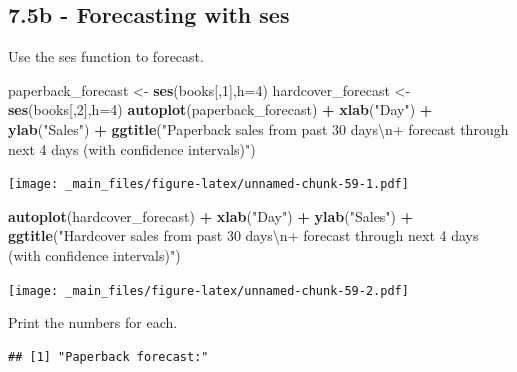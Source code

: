 \documentclass[]{book}
\newenvironment{Shaded}{\begin{snugshade}}{\end{snugshade}}
\newcommand{\CharTok}[1]{\textcolor[rgb]{0.31,0.60,0.02}{#1}}
\newcommand{\DataTypeTok}[1]{\textcolor[rgb]{0.13,0.29,0.53}{#1}}
\newcommand{\DecValTok}[1]{\textcolor[rgb]{0.00,0.00,0.81}{#1}}
\newcommand{\KeywordTok}[1]{\textcolor[rgb]{0.13,0.29,0.53}{\textbf{#1}}}
\newcommand{\NormalTok}[1]{#1}
\newcommand{\OperatorTok}[1]{\textcolor[rgb]{0.81,0.36,0.00}{\textbf{#1}}}
\newcommand{\StringTok}[1]{\textcolor[rgb]{0.31,0.60,0.02}{#1}}
\begin{document}
\hypertarget{b---forecasting-with-ses}{%
\subsection{7.5b - Forecasting with ses}\label{b---forecasting-with-ses}}

Use the ses function to forecast.

\begin{Shaded}
\begin{Highlighting}[]
\NormalTok{paperback_forecast <-}\StringTok{ }\KeywordTok{ses}\NormalTok{(books[,}\DecValTok{1}\NormalTok{],}\DataTypeTok{h=}\DecValTok{4}\NormalTok{)}
\NormalTok{hardcover_forecast <-}\StringTok{ }\KeywordTok{ses}\NormalTok{(books[,}\DecValTok{2}\NormalTok{],}\DataTypeTok{h=}\DecValTok{4}\NormalTok{)}
\KeywordTok{autoplot}\NormalTok{(paperback_forecast) }\OperatorTok{+}\StringTok{ }
\KeywordTok{xlab}\NormalTok{(}\StringTok{"Day"}\NormalTok{) }\OperatorTok{+}\StringTok{ }\KeywordTok{ylab}\NormalTok{(}\StringTok{"Sales"}\NormalTok{) }\OperatorTok{+}\StringTok{ }
\KeywordTok{ggtitle}\NormalTok{(}\StringTok{"Paperback sales from past 30 days}\CharTok{\textbackslash{}n}\StringTok{+ forecast through next 4 days (with confidence intervals)"}\NormalTok{)}
\end{Highlighting}
\end{Shaded}

\texttt{[image: \_main\_files/figure-latex/unnamed-chunk-59-1.pdf]}

\begin{Shaded}
\begin{Highlighting}[]
\KeywordTok{autoplot}\NormalTok{(hardcover_forecast) }\OperatorTok{+}
\KeywordTok{xlab}\NormalTok{(}\StringTok{"Day"}\NormalTok{) }\OperatorTok{+}\StringTok{ }\KeywordTok{ylab}\NormalTok{(}\StringTok{"Sales"}\NormalTok{) }\OperatorTok{+}\StringTok{ }
\KeywordTok{ggtitle}\NormalTok{(}\StringTok{"Hardcover sales from past 30 days}\CharTok{\textbackslash{}n}\StringTok{+ forecast through next 4 days (with confidence intervals)"}\NormalTok{)}
\end{Highlighting}
\end{Shaded}

\texttt{[image: \_main\_files/figure-latex/unnamed-chunk-59-2.pdf]}

Print the numbers for each.

\begin{verbatim}
## [1] "Paperback forecast:"
\end{verbatim}
\end{document}
